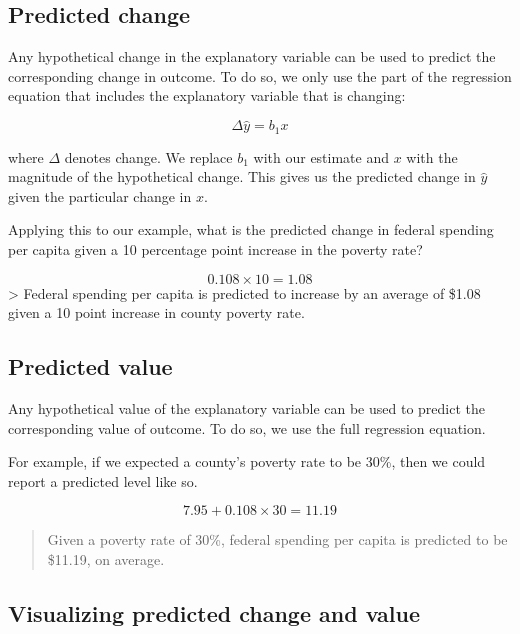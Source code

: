 \documentclass[
]{book}
\begin{document}
\hypertarget{predicted-change}{%
\subsection{Predicted change}\label{predicted-change}}

Any hypothetical change in the explanatory variable can be used to predict the corresponding change in outcome. To do so, we only use the part of the regression equation that includes the explanatory variable that is changing:

\begin{equation}
\Delta \hat{y}=b_1x
\label{eq:predchange}
\end{equation}

where \(\Delta\) denotes change. We replace \(b_1\) with our estimate and \(x\) with the magnitude of the hypothetical change. This gives us the predicted change in \(\hat{y}\) given the particular change in \(x\).

Applying this to our example, what is the predicted change in federal spending per capita given a 10 percentage point increase in the poverty rate?

\[0.108 \times 10 = 1.08\]
\textgreater{} Federal spending per capita is predicted to increase by an average of \$1.08 given a 10 point increase in county poverty rate.

\hypertarget{predicted-value}{%
\subsection{Predicted value}\label{predicted-value}}

Any hypothetical value of the explanatory variable can be used to predict the corresponding value of outcome. To do so, we use the full regression equation.

For example, if we expected a county's poverty rate to be 30\%, then we could report a predicted level like so.

\[7.95 + 0.108 \times 30 = 11.19\]

\begin{quote}
Given a poverty rate of 30\%, federal spending per capita is predicted to be \$11.19, on average.
\end{quote}

\hypertarget{visualizing-predicted-change-and-value}{%
\subsection{Visualizing predicted change and value}\label{visualizing-predicted-change-and-value}}
\end{document}
